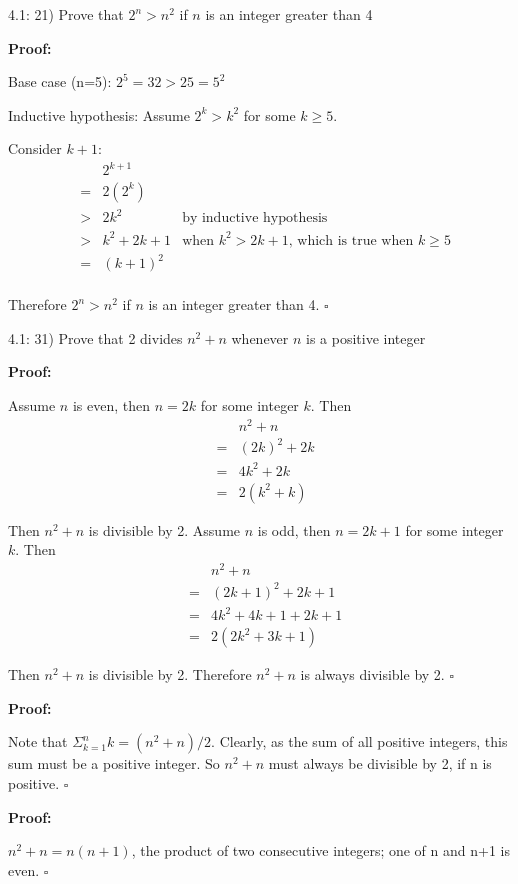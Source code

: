 \documentclass{article}
\newenvironment{proof}
{\color{PineGreen}\begin{list}{}%
         {\setlength{\leftmargin}{1cm}}%
         \item[]%
        \textbf{Proof:}
        
        }
{ $\square$\end{list}}
\begin{document}
4.1: 21) Prove that $2^n > n^2$ if $n$ is an integer greater than 4

\begin{proof}
Base case (n=5):
$2^5 = 32 > 25 = 5^2$

Inductive hypothesis:
Assume $2^k > k^2$ for some $k \geq 5$.

Consider $k+1$:
\[\begin{array}{rclr}
&& 2^{k+1}& \\
&=& 2(2^k) & \\
&>& 2k^2 & \textrm{by inductive hypothesis} \\
&>& k^2 + 2k + 1 & \textrm{when }k^2>2k+1\textrm{, which is true when }k \geq 5 \\
&=& (k+1)^2 &\\
\end{array}\]

Therefore $2^n > n^2$ if $n$ is an integer greater than 4.\end{proof}

4.1: 31) Prove that 2 divides $n^2 + n$ whenever $n$ is a positive integer

\begin{proof} Assume $n$ is even, then $n = 2k$ for some integer $k$. Then 
\[\begin{array}{rcl}
&&n^2 + n \\
&=& (2k)^2 + 2k \\
&=& 4k^2 + 2k \\
&=& 2(k^2 + k)
\end{array}\]

Then $n^2 + n$ is divisible by 2. Assume $n$ is odd, then $n = 2k+1$ for some integer $k$. Then 
\[\begin{array}{rcl}
&&n^2 + n \\
&=& (2k+1)^2 + 2k+1\\
&=& 4k^2 +4k + 1 + 2k + 1 \\
&=& 2(2k^2 + 3k + 1)
\end{array}\]

Then $n^2 + n$ is divisible by 2. Therefore $n^2 + n$ is always divisible by 2.\end{proof}

\begin{proof}Note that $\Sigma^n_{k=1} k = (n^2+n)/2$. Clearly, as the sum of all positive integers, 
this sum must be a positive integer. So $n^2+n$ must always be divisible by 2, if n is positive.\end{proof}

\begin{proof}
$n^2 + n = n(n+1)$, the product of two consecutive integers; one of n and n+1 is even.
\end{proof}
\end{document}

